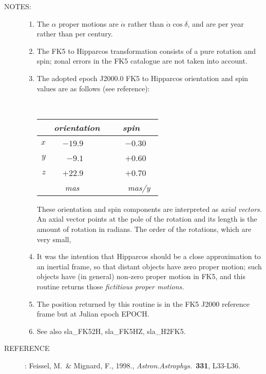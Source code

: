 \documentclass[11pt,twoside]{article}
\newlength{\oldspacing}
\newcommand{\notes}[1]
{
  \goodbreak
  \setlength{\oldspacing}{\topsep}
  \setlength{\topsep}{0.3ex}
  \begin{description}
    \item[NOTES]:
        #1
  \end{description}
  \setlength{\topsep}{\oldspacing}
}
\renewcommand{\notes}[1]
   {
      \begin{description}
         \item[NOTES:]
            #1
      \end{description}
   }
\newcommand{\aref}[1]
{
  \goodbreak
  \setlength{\oldspacing}{\topsep}
  \setlength{\topsep}{0.3ex}
  \begin{description}
    \item[REFERENCE]:
        #1
  \end{description}
  \setlength{\topsep}{\oldspacing}
}
\newcommand{\aref}[1]
   {
     \begin{description}
       \item[REFERENCE:]
           #1
     \end{description}
   }
\begin{document}
\notes
{
 \begin{enumerate}
  \item The $\alpha$ proper motions are $\dot{\alpha}$ rather than
        $\dot{\alpha}\cos\delta$, and are per year rather than per century.
  \item The FK5 to Hipparcos
        transformation consists of a pure rotation and spin;
        zonal errors in the FK5 catalogue are not taken into account.
  \item The adopted epoch J2000.0 FK5 to Hipparcos orientation and spin
        values are as follows (see reference):

        \vspace{2ex}

        ~~~~~~~~~~~~
        \begin{tabular}{|r|r|r|} \hline
        &
        \multicolumn{1}{|c}{\it orientation} &
        \multicolumn{1}{|c|}{\it ~~~spin~~~} \\ \hline
        $x$ & $-19.9$~~~~ & ~$-0.30$~~ \\
        $y$ &  $-9.1$~~~~ & ~$+0.60$~~ \\
        $z$ & $+22.9$~~~~ & ~$+0.70$~~ \\ \hline
        & {\it mas}~~~~~ & ~{\it mas/y}~ \\ \hline
        \end{tabular}

        \vspace{3ex}

        These orientation and spin components are interpreted as
        {\it axial vectors.}  An axial vector points at the pole of
        the rotation and its length is the amount of rotation in radians.
        The order of the rotations, which are very small,
  \item It was the intention that Hipparcos should be a close
        approximation to an inertial frame, so that distant objects
        have zero proper motion;  such objects have (in general)
        non-zero proper motion in FK5, and this routine returns those
        {\it fictitious proper motions.}
  \item The position returned by this routine is in the FK5 J2000
        reference frame but at Julian epoch EPOCH.
  \item See also sla\_FK52H, sla\_FK5HZ, sla\_H2FK5.
 \end{enumerate}
}
\aref {Feissel, M.\ \& Mignard, F., 1998.,  {\it Astron.Astrophys.}\
       {\bf 331}, L33-L36.}
\end{document}
